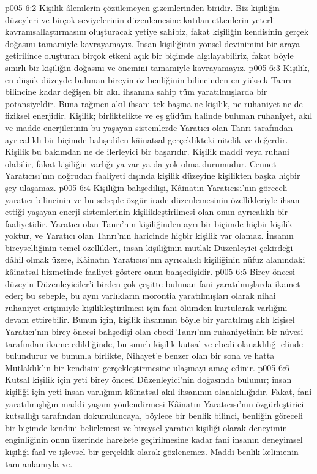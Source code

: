\vs p005 6:2 Kişilik âlemlerin çözülemeyen gizemlerinden biridir. Biz kişiliğin düzeyleri ve birçok seviyelerinin düzenlemesine katılan etkenlerin yeterli kavramsallaştırmasını oluşturacak yetiye sahibiz, fakat kişiliğin kendisinin gerçek doğasını tamamiyle kavrayamayız. İnsan kişiliğinin yönsel devinimini bir araya getirilince oluşturan birçok etkeni açık bir biçimde algılayabiliriz, fakat böyle sınırlı bir kişiliğin doğasını ve önemini tamamiyle kavrayamayız.
\vs p005 6:3 Kişilik, en düşük düzeyde bulunan bireyin öz benliğinin bilincinden en yüksek Tanrı bilincine kadar değişen bir akıl ihsanına sahip tüm yaratılmışlarda bir potansiyeldir. Buna rağmen akıl ihsanı tek başına ne kişilik, ne ruhaniyet ne de fiziksel enerjidir. Kişilik; birliktelikte ve eş güdüm halinde bulunan ruhaniyet, akıl ve madde enerjilerinin bu yaşayan sistemlerde Yaratıcı olan Tanrı tarafından ayrıcalıklı bir biçimde bahşedilen kâinatsal gerçeklikteki nitelik ve değerdir. Kişilik bu bakımdan ne de ilerleyici bir başarıdır. Kişilik maddi veya ruhani olabilir, fakat kişiliğin varlığı ya var ya da yok olma durumudur. Cennet Yaratıcısı’nın doğrudan faaliyeti dışında kişilik düzeyine kişilikten başka hiçbir şey ulaşamaz.
\vs p005 6:4 Kişiliğin bahşedilişi, Kâinatın Yaratıcısı’nın göreceli yaratıcı bilincinin ve bu sebeple özgür irade düzenlemesinin özellikleriyle ihsan ettiği yaşayan enerji sistemlerinin kişilikleştirilmesi olan onun ayrıcalıklı bir faaliyetidir. Yaratıcı olan Tanrı’nın kişiliğinden ayrı bir biçimde hiçbir kişilik yoktur, ve Yaratıcı olan Tanrı’nın haricinde hiçbir kişilik var olamaz. İnsanın bireyselliğinin temel özellikleri, insan kişiliğinin mutlak Düzenleyici çekirdeği dâhil olmak üzere, Kâinatın Yaratıcısı’nın ayrıcalıklı kişiliğinin nüfuz alanındaki kâinatsal hizmetinde faaliyet göstere onun bahşedişidir.
\vs p005 6:5 Birey öncesi düzeyin Düzenleyiciler’i birden çok çeşitte bulunan fani yaratılmışlarda ikamet eder; bu sebeple, bu aynı varlıkların morontia yaratılmışları olarak nihai ruhaniyet erişimiyle kişilikleştirilmesi için fani ölümden kurtularak varlığını devam ettirebilir. Bunun için, kişilik ihsanının böyle bir yaratılmış aklı kişisel Yaratıcı’nın birey öncesi bahşedişi olan ebedi Tanrı’nın ruhaniyetinin bir nüvesi tarafından ikame edildiğinde, bu sınırlı kişilik kutsal ve ebedi olanaklılığı elinde bulundurur ve bununla birlikte, Nihayet’e benzer olan bir sona ve hatta Mutlaklık’ın bir kendisini gerçekleştirmesine ulaşmayı amaç edinir.
\vs p005 6:6 Kutsal kişilik için yeti birey öncesi Düzenleyici’nin doğasında bulunur; insan kişiliği için yeti insan varlığının kâinatsal\hyp{}akıl ihsanının olanaklılığıdır. Fakat, fani yaratılmışlığın maddi yaşam yönlendirmesi Kâinatın Yaratıcısı’nın özgürleştirici kutsallığı tarafından dokunuluncaya, böylece bir benlik bilinci, benliğin göreceli bir biçimde kendini belirlemesi ve bireysel yaratıcı kişiliği olarak deneyimin enginliğinin onun üzerinde harekete geçirilmesine kadar fani insanın deneyimsel kişiliği faal ve işlevsel bir gerçeklik olarak gözlenemez. Maddi benlik kelimenin tam anlamıyla ve.
